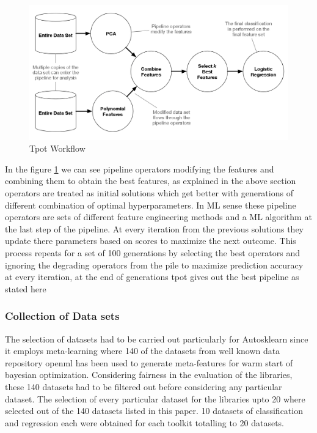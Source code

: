          \begin{figure}[!h]
    	\centering
    	\includegraphics[width=1.0\linewidth]{thesis_template/images/tpot-workflow.png}
    	\caption{Tpot  Workflow}
    	\label{fig:tpot_workflow}
        \end{figure}
        
In the figure \ref{fig:tpot_workflow} we can see pipeline operators modifying the features and combining them to obtain the best features, as explained in the above section operators are treated as initial solutions which get better with generations of different combination of optimal hyperparameters. In ML sense these pipeline operators are sets of different feature engineering methods and a ML algorithm at the last step of the pipeline. At every iteration from the previous solutions they update there parameters based on scores to maximize the next outcome. This process repeats for a set of 100 generations by selecting the best operators and ignoring the degrading operators from the pile to maximize prediction accuracy at every iteration, at the end of generations tpot gives out the best pipeline as stated here \cite{tpot}
        
    
\subsubsection{Collection of Data sets }
The selection of datasets had to be carried out particularly for Autosklearn since it employs meta-learning where 140 of the datasets from well known data repository openml\cite{OpenML2013} has been used to generate meta-features for warm start of bayesian optimization. Considering fairness in the evaluation of the libraries, these 140 datasets had to be filtered out before considering any particular dataset. The selection of every particular dataset for the libraries upto 20 where selected out of the 140 datasets listed in this paper. \cite{autosklearn_supplementary}10 datasets of classification and regression each were obtained for each toolkit totalling to 20 datasets.
   
